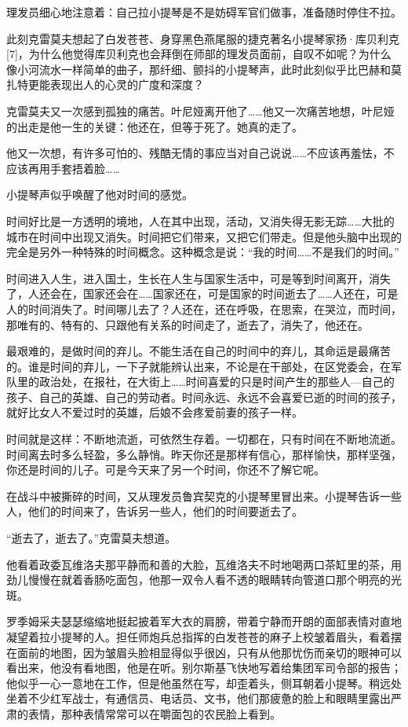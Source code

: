 理发员细心地注意着：自己拉小提琴是不是妨碍军官们做事，准备随时停住不拉。

此刻克雷莫夫想起了白发苍苍、身穿黑色燕尾服的捷克著名小提琴家扬·库贝利克[7]，为什么他觉得库贝利克也会拜倒在师部的理发员面前，自叹不如呢？为什么像小河流水一样简单的曲子，那纤细、颤抖的小提琴声，此时此刻似乎比巴赫和莫扎特更能表现出人的心灵的广度和深度？

克雷莫夫又一次感到孤独的痛苦。叶尼娅离开他了……他又一次痛苦地想，叶尼娅的出走是他一生的关键：他还在，但等于死了。她真的走了。

他又一次想，有许多可怕的、残酷无情的事应当对自己说说……不应该再羞怯，不应该再用手套捂着脸……

小提琴声似乎唤醒了他对时间的感觉。

时间好比是一方透明的境地，人在其中出现，活动，又消失得无影无踪……大批的城市在时间中出现又消失。时间把它们带来，又把它们带走。但是他头脑中出现的完全是另外一种特殊的时间概念。这种概念是说：“我的时间……不是我们的时间。”

时间进入人生，进入国土，生长在人生与国家生活中，可是等到时间离开，消失了，人还会在，国家还会在……国家还在，可是国家的时间逝去了……人还在，可是人的时间消失了。时间哪儿去了？人还在，还在呼吸，在思索，在哭泣，而时间，那唯有的、特有的、只跟他有关系的时间走了，逝去了，消失了，他还在。

最艰难的，是做时间的弃儿。不能生活在自己的时间中的弃儿，其命运是最痛苦的。谁是时间的弃儿，一下子就能辨认出来，不论是在干部处，在区党委会，在军队里的政治处，在报社，在大街上……时间喜爱的只是时间产生的那些人—自己的孩子、自己的英雄、自己的劳动者。时间永远、永远不会喜爱已逝的时间的孩子，就好比女人不爱过时的英雄，后娘不会疼爱前妻的孩子一样。

时间就是这样：不断地流逝，可依然生存着。一切都在，只有时间在不断地流逝。时间离去时多么轻盈，多么静悄。昨天你还是那样有信心，那样愉快，那样坚强，你还是时间的儿子。可是今天来了另一个时间，你还不了解它呢。

在战斗中被撕碎的时间，又从理发员鲁宾契克的小提琴里冒出来。小提琴告诉一些人，他们的时间来了，告诉另一些人，他们的时间要逝去了。

“逝去了，逝去了。”克雷莫夫想道。

他看着政委瓦维洛夫那平静而和善的大脸，瓦维洛夫不时地喝两口茶缸里的茶，用劲儿慢慢在就着香肠吃面包，他那一双令人看不透的眼睛转向管道口那个明亮的光斑。

罗季姆采夫瑟瑟缩缩地挺起披着军大衣的肩膀，带着宁静而开朗的面部表情对直地凝望着拉小提琴的人。担任师炮兵总指挥的白发苍苍的麻子上校皱着眉头，看着摆在面前的地图，因为皱眉头脸相显得似乎很凶，只有从他那忧伤而亲切的眼神可以看出来，他没有看地图，他是在听。别尔斯基飞快地写着给集团军司令部的报告；他似乎一心一意地在工作，但是他虽然在写，却歪着头，侧耳朝着小提琴。稍远处坐着不少红军战士，有通信员、电话员、文书，他们那疲惫的脸上和眼睛里露出严肃的表情，那种表情常常可以在嚼面包的农民脸上看到。

